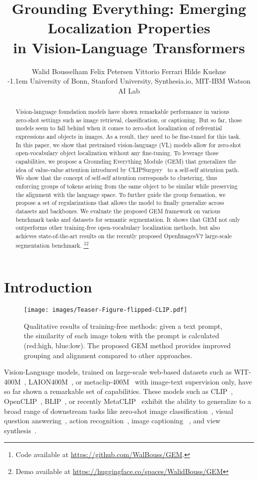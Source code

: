\documentclass[10pt,twocolumn,letterpaper]{article}
\title{Grounding Everything: Emerging Localization Properties \\ in Vision-Language Transformers}
\author{Walid Bousselham \quad
    Felix Petersen  \quad
    Vittorio Ferrari  \quad
    Hilde Kuehne \\
    \kern-1.1em\small{
    University of Bonn,
    Stanford University, 
    Synthesia.io, 
    MIT-IBM Watson AI Lab
    } \\
}
\begin{document}
\maketitle
\begin{abstract}
Vision-language foundation models have shown remarkable performance in various zero-shot settings such as image retrieval,  classification, or captioning. But so far, those models seem to fall behind when it comes to zero-shot localization of referential expressions and objects in images. As a result, they need to be fine-tuned for this task.
In this paper, we show that pretrained vision-language (VL) models allow for zero-shot open-vocabulary object localization without any fine-tuning. To leverage those capabilities, we propose a Grounding Everything Module (GEM) that generalizes the idea of value-value attention introduced by CLIPSurgery~\citep{li2023clipsurgery} to a self-self attention path. We show that the concept of self-self attention corresponds to clustering, thus enforcing groups of tokens arising from the same object to be similar while preserving the alignment with the language space. To further guide the group formation, we propose a set of regularizations that allows the model to finally generalize across datasets and backbones. 
We evaluate the proposed GEM framework on various benchmark tasks and datasets for semantic segmentation. It shows that GEM not only outperforms other training-free open-vocabulary localization methods, but also achieves state-of-the-art results on the recently proposed OpenImagesV7 large-scale segmentation benchmark. \footnote{Code available at \url{https://github.com/WalBouss/GEM}.}\footnote{Demo available at \url{https://huggingface.co/spaces/WalidBouss/GEM}}
\end{abstract} \section{Introduction}
\label{sec:intro}
\begin{figure}[ht]
\centering \label{fig:teaser-fig}
     \texttt{[image: images/Teaser-Figure-flipped-CLIP.pdf]}
     \caption{Qualitative results of training-free methods: given a text prompt, the similarity of each image token with the prompt is calculated (red:high, blue:low). The proposed GEM method provides improved grouping and alignment compared to other approaches.}
     \label{fig:teaser}
\end{figure}
Vision-Language models, trained on large-scale web-based datasets such as WIT-400M~\citep{radford2021learning}, LAION400M~\citep{schuhmann2022laion}, or metaclip-400M~\citep{xu2023demystifying} with image-text supervision only, have so far shown a remarkable set of capabilities. These models such as CLIP~\citep{radford2021learning}, OpenCLIP~\citep{schuhmann2022laion}, BLIP~\citep{li2022blip}, or recently MetaCLIP~\citep{xu2023demystifying} exhibit the ability to generalize to a broad range of downstream tasks like zero-shot image classification~\citep{radford2021learning, jia2021scaling, cherti2023reproducible}, visual question answering~\citep{khan2022weakly}, action recognition~\citep{yuan2021florence, yu2022coca}, image captioning ~\citep{li2022blip, li2019visualbert},  and view synthesis~\citep{jain2021putting}. 
\end{document}
